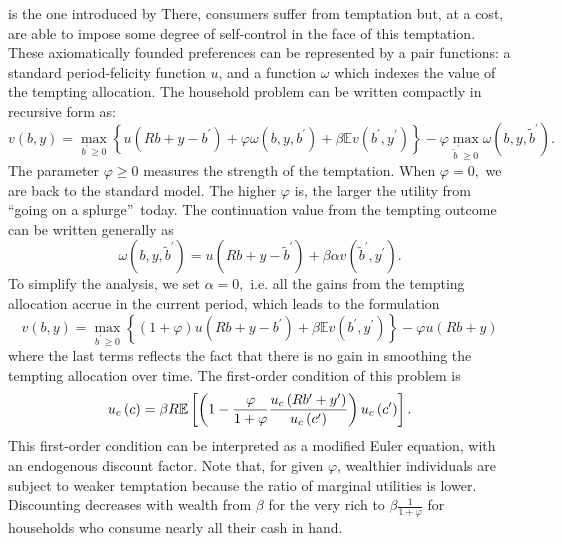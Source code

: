 is the one introduced by 
 There, consumers suffer from temptation but, at a
cost, are able to impose some degree of self-control in the face of this
temptation. These axiomatically founded preferences can be represented by a
pair functions: a standard period-felicity function $u$, and a function $\omega$
which indexes the value of the tempting allocation. The household
problem can be written compactly in recursive form as:%
\begin{equation*}
v\left( b,y\right) =\max_{b^{\prime }\geq 0}\left\{ u\left( Rb+y-b^{\prime
}\right) +\varphi \omega\left( b,y,b^{\prime }\right) +\beta \mathbb{E}%
v\left( b^{\prime },y^{\prime }\right) \right\} -\varphi \max_{\tilde{b}%
^{\prime }\geq 0}\omega\left( b,y,\tilde{b}^{\prime }\right) .
\end{equation*}%
The parameter $\varphi \geq 0$ measures the strength of the temptation. When 
$\varphi =0,$ we are back to the standard model. The higher $\varphi $ is,
the larger the utility from \textquotedblleft going on a
splurge\textquotedblright\ today. The continuation value from the tempting
outcome can be written generally as 
\begin{equation*}
\omega\left( b,y,\tilde{b}^{\prime }\right) =u\left( Rb+y-\tilde{b}^{\prime
}\right) +\beta \alpha v\left( \tilde{b}^{\prime },y^{\prime }\right) .
\end{equation*}%
To simplify the analysis, we set $\alpha =0,$ i.e. all the gains from the
tempting allocation accrue in the current period, which leads to the
formulation 
\begin{equation}
v\left( b,y\right) =\max_{b^{\prime }\geq 0}\left\{ \left( 1+\varphi \right)
u\left( Rb+y-b^{\prime }\right) +\beta \mathbb{E}v\left( b^{\prime
},y^{\prime }\right) \right\} -\varphi u\left( Rb+y\right)
\label{eq:TSC_utility}
\end{equation}%
where the last terms reflects the fact that there is no gain in smoothing
the tempting allocation over time. The first-order condition of this problem
is 
\begin{equation}
u_{c}\left( c\right) =\beta R\mathbb{E}\left[ \left( 1-\frac{\varphi }{%
1+\varphi }\frac{u_{c}\left( Rb^{\prime }+y^{\prime }\right) }{u_{c}\left(
c^{\prime }\right) }\right) u_{c}\left( c^{\prime }\right) \right] .
\label{eq:TSC_FOC}
\end{equation}%
This first-order condition can be interpreted as a modified Euler equation,
with an endogenous discount factor. Note that, for given $\varphi $, wealthier individuals are subject to weaker temptation because the ratio of marginal utilities is lower. Discounting decreases with wealth from $\beta$ for the very rich to $\beta \frac{1}{1+\varphi}$ for households who consume nearly all their cash in hand.


\renewcommand{\baselinestretch}{1.04} 
{\small


}

\newpage
\setcounter{page}{1}
\clearpage\newpage



